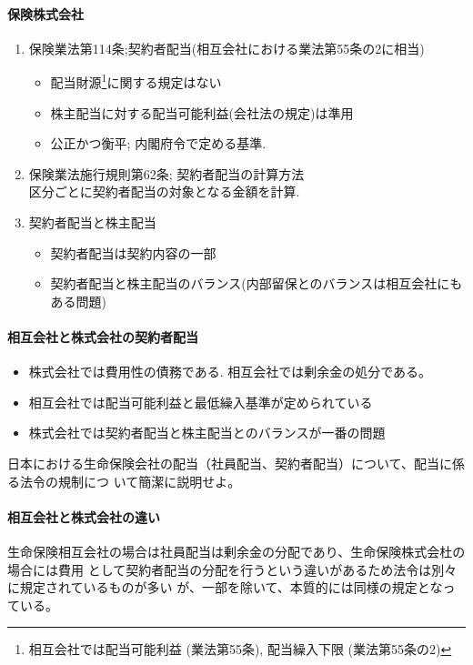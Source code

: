 \documentclass[report,gutter=10mm,fore-edge=10mm,uplatex,dvipdfmx]{jlreq}
\begin{document}
\paragraph{保険株式会社}
\begin{enumerate}
 \item 保険業法第114条;契約者配当(相互会社における業法第55条の2に相当)
\begin{itemize}
 \item 配当財源\footnote{ 相互会社では配当可能利益 (業法第55条),  配当繰入下限 (業法第55条の2)}に関する規定はない
 \item 株主配当に対する配当可能利益(会社法の規定)は準用
 \item 公正かつ衡平; 内閣府令で定める基準. 
\end{itemize}
 \item 保険業法施行規則第62条; 契約者配当の計算方法\\
       区分ごとに契約者配当の対象となる金額を計算.  
 \item 契約者配当と株主配当
\begin{itemize}
 \item 契約者配当は契約内容の一部
 \item 契約者配当と株主配当のバランス(内部留保とのバランスは相互会社にもある問題)
\end{itemize}
\end{enumerate}

\paragraph{相互会社と株式会社の契約者配当}
\begin{itemize}
 \item 株式会社では費用性の債務である. 相互会社では剰余金の処分である。
 \item 相互会社では配当可能利益と最低繰入基準が定められている
 \item 株式会社では契約者配当と株主配当とのバランスが一番の問題
\end{itemize}


日本における生命保険会社の配当（社員配当、契約者配当）について、配当に係る法令の規制につ
いて簡潔に説明せよ。

\paragraph{相互会社と株式会社の違い}
生命保険相互会社の場合は社員配当は剰余金の分配であり、生命保険株式会杜の場合には費用
として契約者配当の分配を行うという違いがあるため法令は別々に規定されているものが多い
が、一部を除いて、本質的には同様の規定となっている。
\end{document}
